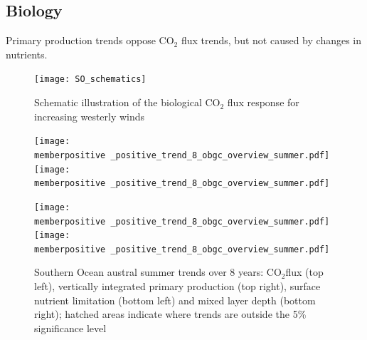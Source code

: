 \documentclass[aspectratio=169]{beamer}
\newcommand{\memberpositive}{m178_1985_1992} %
\begin{document}
\subsection{Biology}
\begin{frame}{Primary production trends oppose CO$_2$ flux trends, but not caused by changes in nutrients.}

	\begin{minipage}{.3\textwidth}
		
		\begin{figure}[h!]
			\centering
			\texttt{[image: SO\_schematics]}
			\caption{Schematic illustration of the biological CO$_2$ flux response for increasing westerly winds}
			\label{fig:schematics_neg}
		\end{figure}		
	
		
	\end{minipage} \hfill
	\begin{minipage}{.66\textwidth}
	\begin{figure}
		\centering
		\vspace{-6mm}
		\texttt{[image: \\memberpositive \_positive\_trend\_8\_obgc\_overview\_summer.pdf]} %
\texttt{[image: \\memberpositive \_positive\_trend\_8\_obgc\_overview\_summer.pdf]} %

\texttt{[image: \\memberpositive \_positive\_trend\_8\_obgc\_overview\_summer.pdf]} %
\texttt{[image: \\memberpositive \_positive\_trend\_8\_obgc\_overview\_summer.pdf]} %
\caption{Southern Ocean austral summer trends over 8 years: CO$_2$flux (top left), vertically integrated primary production (top right), surface nutrient limitation (bottom left) and mixed layer depth (bottom right); hatched areas indicate where trends are outside the 5\% significance level}
\label{fig:co2flux_intpp}
	\end{figure}
		\end{minipage}
\end{frame}	
\end{document}
